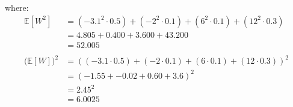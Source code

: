 \documentclass{article}
\begin{document}
\begin{enumerate}
\begin{enumerate}
            where:
            \begin{equation}
            \begin{split}
                \mathbb{E}{[W^{2}]} &= (-3.1^{2}  \cdot 0.5) + (-2^{2} \cdot 0.1) + (6^{2} \cdot 0.1) + (12^{2} \cdot 0.3)\\
                    &=4.805 + 0.400 + 3.600 + 43.200\\
                    &=52.005\\~\\
                (\mathbb{E}{[W])^{2}}&= ((-3.1  \cdot 0.5) + (-2 \cdot 0.1) + (6 \cdot 0.1) + (12 \cdot 0.3))^{2}\\
                &= (-1.55 + -0.02 + 0.60 + 3.6)^{2}\\
                &= 2.45^{2}\\
                &=6.0025
            \end{split}
            \end{equation}
    \end{enumerate}
\end{enumerate}
\end{document}

